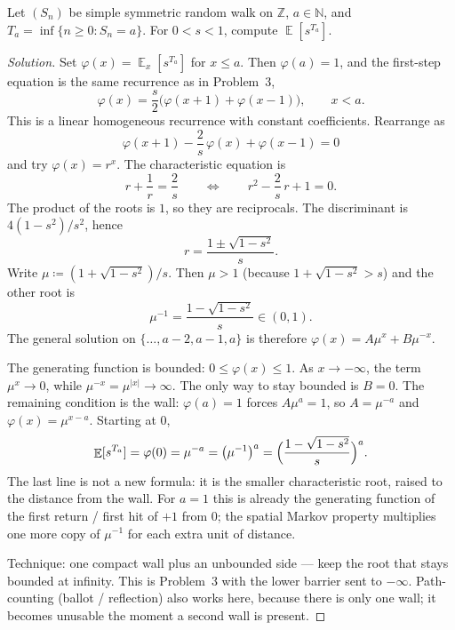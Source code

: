 \documentclass[11pt,a4paper]{article}
\DeclareMathOperator{\E}{\mathbb{E}}
\begin{document}
\begin{example}
\label{ex:stop-one-barrier-pgf}
Let \( (S_n) \) be simple symmetric random walk on \( \mathbb{Z} \), \( a\in\mathbb{N} \), and \( T_a=\inf\{n\ge 0:S_n=a\} \). For \( 0<s<1 \), compute \( \E[s^{T_a}] \).
\end{example}

\begin{proof}[Solution]
Set \( \varphi(x)=\E_x[s^{T_a}] \) for \( x\le a \). Then \( \varphi(a)=1 \), and the first-step equation is the same recurrence as in Problem~3,
\[
\varphi(x)
=
\frac{s}{2}\bigl(\varphi(x+1)+\varphi(x-1)\bigr),
\qquad
x<a.
\]
This is a linear homogeneous recurrence with constant coefficients. Rearrange as
\[
\varphi(x+1)-\frac{2}{s}\,\varphi(x)+\varphi(x-1)=0
\]
and try \( \varphi(x)=r^{x} \). The characteristic equation is
\[
r+\frac{1}{r}=\frac{2}{s}
\qquad\Longleftrightarrow\qquad
r^{2}-\frac{2}{s}\,r+1=0.
\]
The product of the roots is \( 1 \), so they are reciprocals. The discriminant is \( 4(1-s^{2})/s^{2} \), hence
\[
r
=
\frac{1\pm\sqrt{1-s^{2}}}{s}.
\]
Write \( \mu\coloneqq(1+\sqrt{1-s^{2}})/s \). Then \( \mu>1 \) (because \( 1+\sqrt{1-s^{2}}>s \)) and the other root is
\[
\mu^{-1}
=
\frac{1-\sqrt{1-s^{2}}}{s}
\in
(0,1).
\]
The general solution on \( \{\dots,a-2,a-1,a\} \) is therefore \( \varphi(x)=A\mu^{x}+B\mu^{-x} \).

The generating function is bounded: \( 0\le\varphi(x)\le 1 \). As \( x\to-\infty \), the term \( \mu^{x}\to 0 \), while \( \mu^{-x}=\mu^{|x|}\to\infty \). The only way to stay bounded is \( B=0 \). The remaining condition is the wall: \( \varphi(a)=1 \) forces \( A\mu^{a}=1 \), so \( A=\mu^{-a} \) and \( \varphi(x)=\mu^{x-a} \). Starting at \( 0 \),
\[
\E[s^{T_a}]
=
\varphi(0)
=
\mu^{-a}
=
\bigl(\mu^{-1}\bigr)^{a}
=
\Bigl(\frac{1-\sqrt{1-s^{2}}}{s}\Bigr)^{a}.
\]
The last line is not a new formula: it is the smaller characteristic root, raised to the distance from the wall. For \( a=1 \) this is already the generating function of the first return / first hit of \( +1 \) from \( 0 \); the spatial Markov property multiplies one more copy of \( \mu^{-1} \) for each extra unit of distance.

Technique: one compact wall plus an unbounded side --- keep the root that stays bounded at infinity. This is Problem~3 with the lower barrier sent to \( -\infty \). Path-counting (ballot / reflection) also works here, because there is only one wall; it becomes unusable the moment a second wall is present.
\end{proof}
\end{document}
